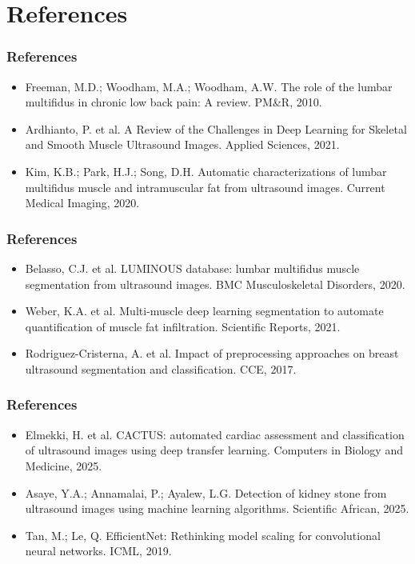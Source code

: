 \documentclass{beamer}
\begin{document}
\section{References}

\begin{frame}
\frametitle{References}
\begin{itemize}
\item [1] Freeman, M.D.; Woodham, M.A.; Woodham, A.W. The role of the lumbar multifidus in chronic low back pain: A review. PM\&R, 2010.
\item [2] Ardhianto, P. et al. A Review of the Challenges in Deep Learning for Skeletal and Smooth Muscle Ultrasound Images. Applied Sciences, 2021.
\item [3] Kim, K.B.; Park, H.J.; Song, D.H. Automatic characterizations of lumbar multifidus muscle and intramuscular fat from ultrasound images. Current Medical Imaging, 2020.
\end{itemize}
\end{frame}

\begin{frame}
\frametitle{References}
\begin{itemize}
\item [4] Belasso, C.J. et al. LUMINOUS database: lumbar multifidus muscle segmentation from ultrasound images. BMC Musculoskeletal Disorders, 2020.
\item [5] Weber, K.A. et al. Multi-muscle deep learning segmentation to automate quantification of muscle fat infiltration. Scientific Reports, 2021.
\item [6] Rodriguez-Cristerna, A. et al. Impact of preprocessing approaches on breast ultrasound segmentation and classification. CCE, 2017.
\end{itemize}
\end{frame}

\begin{frame}
\frametitle{References}
\begin{itemize}
\item [7] Elmekki, H. et al. CACTUS: automated cardiac assessment and classification of ultrasound images using deep transfer learning. Computers in Biology and Medicine, 2025.
\item [8] Asaye, Y.A.; Annamalai, P.; Ayalew, L.G. Detection of kidney stone from ultrasound images using machine learning algorithms. Scientific African, 2025.
\item [9] Tan, M.; Le, Q. EfficientNet: Rethinking model scaling for convolutional neural networks. ICML, 2019.
\end{itemize}
\end{frame}
\end{document}
